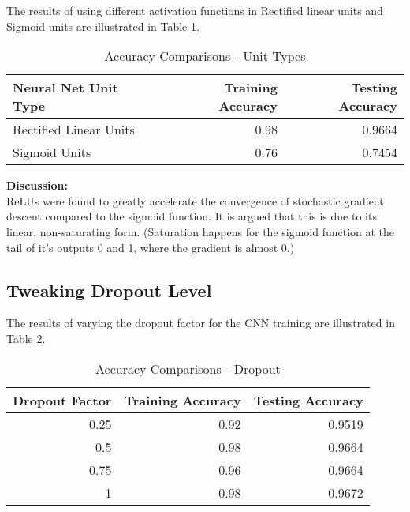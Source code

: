 \documentclass[parskip=half]{scrartcl}
\begin{document}
        The results of using different activation functions in Rectified linear units and Sigmoid units are illustrated in Table \ref{tab:accuracy_comparisons_unit_types}.

        \begin{table}[th]
            \centering
            \begin{tabular}{| l | r | r |}
            \hline
            \textbf{Neural Net Unit Type} & \textbf{Training Accuracy} & \textbf{Testing Accuracy} \\
            \hline
                \hline
                Rectified Linear Units & 0.98 & 0.9664 \\
                \hline
                Sigmoid Units & 0.76 & 0.7454 \\
            \hline
            \end{tabular}
            \caption{Accuracy Comparisons - Unit Types}
            \label{tab:accuracy_comparisons_unit_types}
        \end{table}

        \textbf{Discussion:}\\
        ReLUs were found to greatly accelerate the convergence of stochastic gradient descent compared to the sigmoid function. It is argued that this is due to its linear, non-saturating form. (Saturation happens for the sigmoid function at the tail of it's outputs 0 and 1, where the gradient is almost 0.)
    

    \subsection{Tweaking Dropout Level} %
    \label{sub:tweaking_dropout_level}

        The results of varying the dropout factor for the CNN training are illustrated in Table \ref{tab:accuracy_comparisons_dropout}.

        \begin{table}[th]
            \centering
            \begin{tabular}{| r | r | r |}
            \hline
            \textbf{Dropout Factor} & \textbf{Training Accuracy} & \textbf{Testing Accuracy} \\
            \hline
                \hline
                0.25 & 0.92 & 0.9519 \\
                \hline
                0.5 & 0.98 & 0.9664 \\
                \hline
                0.75 & 0.96 & 0.9664 \\
                \hline
                1 & 0.98 & 0.9672 \\
            \hline
            \end{tabular}
            \caption{Accuracy Comparisons - Dropout}
            \label{tab:accuracy_comparisons_dropout}
        \end{table}
    
\end{document}
